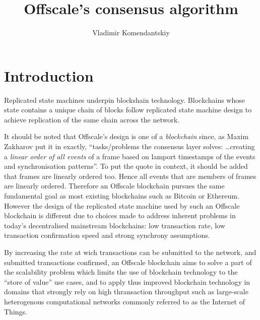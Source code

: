 \documentclass[a4paper,11pt]{article}
\title{Offscale's consensus algorithm}
\author{Vladimir Komendantskiy}
\begin{document}
\maketitle



\section{Introduction}

Replicated state machines underpin blockshain technology. Blockchains whose state contains a unique
chain of blocks follow replicated state machine design to achieve replication of the same chain
across the network.

It should be noted that Offscale's design is one of a \emph{blockchain} since, as Maxim Zakharov put
it in \cite{notes} exactly, ``tasks/problems the consensus layer solves: \dots creating a
\emph{linear order of all events} of a frame based on lamport timestamps of the events and
synchronisation patterns''. To put the quote in context, it should be added that frames are linearly
ordered too. Hence all events that are members of frames are linearly ordered. Therefore an Offscale
blockchain pursues the same fundamental goal as most existing blockchains such as Bitcoin or
Ethereum. However the design of the replicated state machine used by such an Offscale blockchain is
different due to choices made to address inherent problems in today's decentralised mainstream
blockchains: low transaction rate, low transaction confirmation speed and strong synchrony
assumptions.

By increasing the rate at wich transactions can be submitted to the network, and submitted
transactions confirmed, an Offscale blockchain aims to solve a part of the scalability problem which
limits the use of blockchain technology to the ``store of value'' use cases, and to apply thus
improved blockchain technology in domains that strongly rely on high thransaction throughput such as
large-scale heterogenous computational networks commonly referred to as the Internet of Things.
\end{document}
